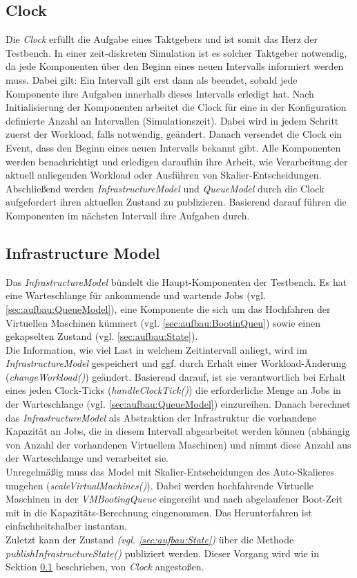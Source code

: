 \subsection{Clock}
\label{sec:aufbau:Clock}
Die \textit{Clock} erfüllt die Aufgabe eines Taktgebers und ist somit das Herz der Testbench. In einer zeit-diskreten Simulation ist es solcher Taktgeber notwendig, da jede Komponenten über den Beginn eines neuen Intervalls informiert werden muss. Dabei gilt: Ein Intervall gilt erst dann als beendet, sobald jede Komponente ihre Aufgaben innerhalb dieses Intervalls erledigt hat. Nach Initialisierung der Komponenten arbeitet die Clock für eine in der Konfiguration definierte Anzahl an Intervallen (Simulationszeit). Dabei wird in jedem Schritt zuerst der Workload, falls notwendig, geändert. Danach versendet die Clock ein Event, dass den Beginn eines neuen Intervalls bekannt gibt. Alle Komponenten werden benachrichtigt und erledigen daraufhin ihre Arbeit, wie Verarbeitung der aktuell anliegenden Workload oder Ausführen von Skalier-Entscheidungen. Abschließend werden \textit{InfrastructureModel} und \textit{QueueModel} durch die Clock aufgefordert ihren aktuellen Zustand zu publizieren. Basierend darauf führen die Komponenten im nächsten Intervall ihre Aufgaben durch. 


\subsection{Infrastructure Model}
Das \textit{InfrastructureModel} bündelt die Haupt-Komponenten der Testbench. Es hat eine Warteschlange für ankommende und wartende Jobs (vgl. \ref{sec:aufbau:QueueModel}), eine Komponente die sich um das Hochfahren der Virtuellen Maschinen kümmert (vgl. \ref{sec:aufbau:BootinQueu}) sowie einen gekapselten Zustand (vgl. \ref{sec:aufbau:State}). \\
Die Information, wie viel Last in welchem Zeitintervall anliegt, wird im \textit{InfrastructureModel} gespeichert und ggf. durch Erhalt einer Workload-Änderung (\textit{changeWorkload()}) geändert. Basierend darauf, ist sie verantwortlich bei Erhalt eines jeden Clock-Ticks (\textit{handleClockTick()}) die erforderliche Menge an Jobs in der Warteschlange (vgl. \ref{sec:aufbau:QueueModel}) einzureihen. Danach berechnet das \textit{InfrastructureModel} als Abstraktion der Infrastruktur die vorhandene Kapazität an Jobs, die in diesem Intervall abgearbeitet werden können (abhängig von Anzahl der vorhandenen Virtuellem Maschinen) und nimmt diese Anzahl aus der Warteschlange und verarbeitet sie. \\
Unregelmäßig muss das Model mit Skalier-Entscheidungen des Auto-Skalieres umgehen (\textit{scaleVirtualMachines()}). Dabei werden hochfahrende Virtuelle Maschinen in der \textit{VMBootingQueue} eingereiht und nach abgelaufener Boot-Zeit mit in die Kapazitäts-Berechnung eingenommen. Das Herunterfahren ist einfachheitshalber instantan.\\
Zuletzt kann der Zustand \textit{(vgl. \ref{sec:aufbau:State})} über die Methode \textit{publishInfrastructureState()} publiziert werden. Dieser Vorgang wird wie in Sektion \ref{sec:aufbau:Clock} beschrieben, von \textit{Clock} angestoßen.

